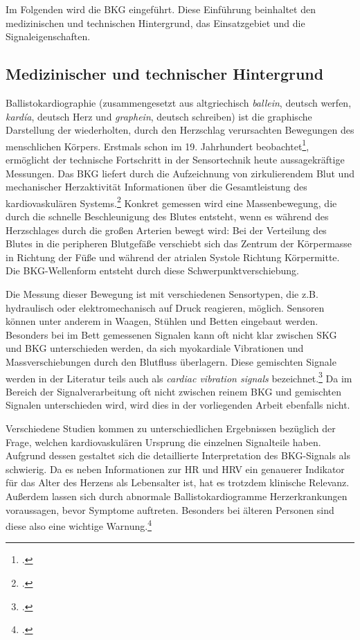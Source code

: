 	Im Folgenden wird die \acl{BKG} eingeführt. Diese Einführung beinhaltet den medizinischen und technischen Hintergrund, das Einsatzgebiet und die Signaleigenschaften.
	
	\subsection{Medizinischer und technischer Hintergrund}
	
	Ballistokardiographie (zusammengesetzt aus altgriechisch \textit{ballein}, deutsch \glq werfen\grq, \textit{kardía}, deutsch \glq Herz\grq{} und \textit{graphein}, deutsch \glq schreiben\grq) ist die graphische Darstellung der wiederholten, durch den Herzschlag verursachten Bewegungen des menschlichen Körpers. Erstmals schon im 19. Jahrhundert beobachtet\footcite[Vgl.][]{Gordon1877}, ermöglicht der technische Fortschritt in der Sensortechnik heute aussagekräftige Messungen. Das \ac{BKG} liefert durch die Aufzeichnung von zirkulierendem Blut und mechanischer Herzaktivität Informationen über die Gesamtleistung des kardiovaskulären Systems.\footcite[Vgl.][]{Pinheiro2010} Konkret gemessen wird eine Massenbewegung, die durch die schnelle Beschleunigung des Blutes entsteht, wenn es während des Herzschlages durch die großen Arterien bewegt wird: Bei der Verteilung des Blutes in die peripheren Blutgefäße verschiebt sich das Zentrum der Körpermasse in Richtung der Füße und während der atrialen Systole Richtung Körpermitte. Die \ac{BKG}-Wellenform entsteht durch diese Schwerpunktverschiebung.
	
	Die Messung dieser Bewegung ist mit verschiedenen Sensortypen, die z.B. hydraulisch oder elektromechanisch auf Druck reagieren, möglich. Sensoren können unter anderem in Waagen, Stühlen und Betten eingebaut werden. Besonders bei im Bett gemessenen Signalen kann oft nicht klar zwischen \ac{SKG} und \ac{BKG} unterschieden werden, da sich myokardiale Vibrationen und Massverschiebungen durch den Blutfluss überlagern. Diese gemischten Signale werden in der Literatur teils auch als \textit{cardiac vibration signals} bezeichnet.\footcite[Vgl.][]{Bruser2013} Da im Bereich der Signalverarbeitung oft nicht zwischen reinem \ac{BKG} und gemischten Signalen unterschieden wird, wird dies in der vorliegenden Arbeit ebenfalls nicht. %
	
	Verschiedene Studien kommen zu unterschiedlichen Ergebnissen bezüglich der Frage, welchen kardiovaskulären Ursprung die einzelnen Signalteile haben. Aufgrund dessen gestaltet sich die detaillierte Interpretation des \ac{BKG}-Signals als schwierig. Da es neben Informationen zur \ac{HR} und \ac{HRV} ein genauerer Indikator für das Alter des Herzens als Lebensalter ist, hat es trotzdem klinische Relevanz. Außerdem lassen sich durch abnormale Ballistokardiogramme Herzerkrankungen voraussagen, bevor Symptome auftreten. Besonders bei älteren Personen sind diese also eine wichtige Warnung.\footcite[Vgl. zu diesem Absatz][]{Pinheiro2010}
	
